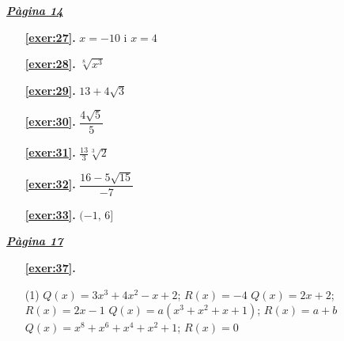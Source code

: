 
\hyperlink{page.14}{\textbf{\em Pàgina 14}}
\begin{enumerate}
\item[\fontfamily{phv}\selectfont\color{blue}\textbf{\ref{exer:27}. }] \label{ans:27} 
$x=-10$ i $x=4$
 \end{enumerate}
\begin{enumerate}
\item[\fontfamily{phv}\selectfont\color{blue}\textbf{\ref{exer:28}. }] \label{ans:28} 
$\sqrt [8]{x^3}$
\item[\fontfamily{phv}\selectfont\color{blue}\textbf{\ref{exer:29}. }] \label{ans:29} 
$13+4\sqrt {3}$
\item[\fontfamily{phv}\selectfont\color{blue}\textbf{\ref{exer:30}. }] \label{ans:30} 
$\dfrac {4\sqrt {5}}{5}$
\item[\fontfamily{phv}\selectfont\color{blue}\textbf{\ref{exer:31}. }] \label{ans:31} 
$\frac {13}{3}\sqrt [3]{2}$
\item[\fontfamily{phv}\selectfont\color{blue}\textbf{\ref{exer:32}. }] \label{ans:32} 
$\dfrac {16-5\sqrt {15}}{-7}$
\item[\fontfamily{phv}\selectfont\color{blue}\textbf{\ref{exer:33}. }] \label{ans:33} 
$(-1,\,6]$
 \end{enumerate}

 \vspace{1cm} 
 

\vspace{0.3cm}


\hyperlink{page.17}{\textbf{\em Pàgina 17}}
\begin{enumerate}



 \item[\fontfamily{phv}\selectfont\color{blue}\textbf{\ref{exer:37}. }] \label{ans:37}
 \begin{tasks}[column-sep=1em, item-indent=1.3333em](1)
	 \task*  $Q(x)=3x^{3}+4x^{2}-x+2$; $R(x)=-4$
	 \task $Q(x)=2x+2$; $R(x)=2x-1$
	 \task* $Q(x)=a(x^{3}+ x^{2}+ x+ 1)$; $R(x)=a+b$
	 \task* $Q(x)=x^{8}+ x^{6}+ x^{4}+ x^{2}+ 1$; $R(x)=0$ 
\end{tasks}
 \end{enumerate}
\vspace{0.3cm}

